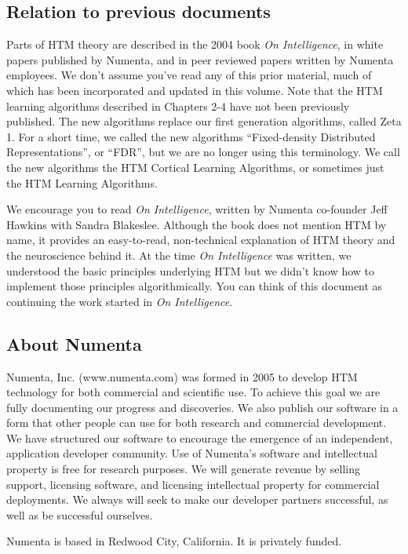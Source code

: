 \subsection*{Relation to previous documents}

Parts of HTM theory are described in the 2004 book {\em On
  Intelligence}, in white papers published by Numenta, and in peer
reviewed papers written by Numenta employees. We don't assume you've
read any of this prior material, much of which has been incorporated
and updated in this volume. Note that the HTM learning algorithms
described in Chapters 2-4 have not been previously published. The new
algorithms replace our first generation algorithms, called Zeta 1. For
a short time, we called the new algorithms ``Fixed-density Distributed
Representations'', or ``FDR'', but we are no longer using this
terminology. We call the new algorithms the HTM Cortical Learning
Algorithms, or sometimes just the HTM Learning Algorithms.

We encourage you to read {\em On Intelligence}, written by Numenta
co-founder Jeff Hawkins with Sandra Blakeslee. Although the book does
not mention HTM by name, it provides an easy-to-read, non-technical
explanation of HTM theory and the neuroscience behind it. At the time
{\em On Intelligence} was written, we understood the basic
principles underlying HTM but we didn't know how to implement those
principles algorithmically. You can think of this document as
continuing the work started in {\em On Intelligence}.

\subsection*{About Numenta}

Numenta, Inc. (www.numenta.com) was formed in 2005 to develop HTM
technology for both commercial and scientific use. To achieve this
goal we are fully documenting our progress and discoveries. We also
publish our software in a form that other people can use for both
research and commercial development. We have structured our software
to encourage the emergence of an independent, application developer
community. Use of Numenta's software and intellectual property is free
for research purposes. We will generate revenue by selling support,
licensing software, and licensing intellectual property for commercial
deployments. We always will seek to make our developer partners
successful, as well as be successful ourselves.

Numenta is based in Redwood City, California. It is privately funded.


